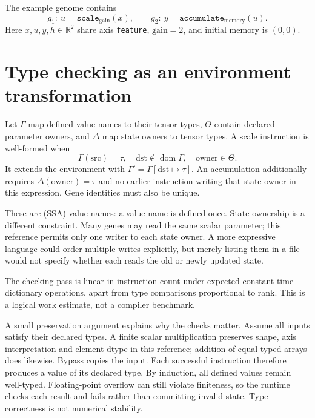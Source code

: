 The example genome contains
\[
 g_1:\ u=\texttt{scale}_{\mathrm{gain}}(x),\qquad
 g_2:\ y=\texttt{accumulate}_{\mathrm{memory}}(u).
\]
Here $x,u,y,h\in\mathbb R^2$ share axis \texttt{feature},
$\mathrm{gain}=2$, and initial memory is $(0,0)$.

\section{Type checking as an environment transformation}
Let $\Gamma$ map defined value names to their tensor types, $\Theta$ contain
declared parameter owners, and $\Delta$ map state owners to tensor types.
A scale instruction is well-formed when
\begin{equation}
 \Gamma(\mathrm{src})=\tau,\quad
 \mathrm{dst}\notin\operatorname{dom}\Gamma,\quad
 \mathrm{owner}\in\Theta.
\end{equation}
It extends the environment with
$\Gamma'=\Gamma[\mathrm{dst}\mapsto\tau]$.
An accumulation additionally requires
$\Delta(\mathrm{owner})=\tau$ and no earlier instruction writing that state
owner in this expression. Gene identities must also be unique.

These are  (SSA) value names: a value name
is defined once. State ownership is a different constraint. Many genes
may read the same scalar parameter; this reference permits only one
writer to each state owner. A more expressive language could order multiple
writes explicitly, but merely listing them in a file would not specify
whether each reads the old or newly updated state.


The checking pass is linear in instruction count under expected constant-time
dictionary operations, apart from type comparisons proportional to rank.
This is a logical work estimate, not a compiler benchmark.

A small preservation argument explains why the checks matter. Assume all
inputs satisfy their declared types. A finite scalar multiplication preserves
shape, axis interpretation and element dtype in this reference; addition of
equal-typed arrays does likewise. Bypass copies the input. Each successful
instruction therefore produces a value of its declared type. By induction,
all defined values remain well-typed. Floating-point overflow can still
violate finiteness, so the runtime checks each result and fails rather than
committing invalid state. Type correctness is not numerical stability.

